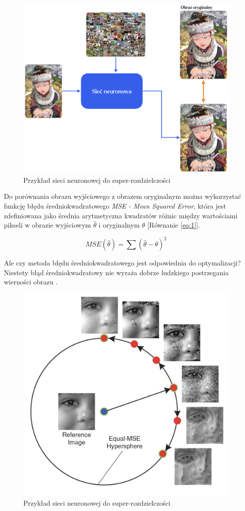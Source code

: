 \begin{figure}[h]
    \centering
    \includegraphics[width=0.55\linewidth]{Rozdziały/02.Podstawy_teoretyczne/Obrazy/SR_CNN.png}
    \caption{Przykład sieci neuronowej do super-rozdzielczości}
    \label{fig:image18}
\end{figure}



Do porównania obrazu wyjściowego z obrazem oryginalnym można wykorzystać funkcję błędu średniokwadratowego \textit{MSE - Mean Squared Error}, która jest zdefiniowana jako średnia arytmetyczna kwadratów różnic między wartościami pikseli w obrazie wyjściowym $\hat{\theta }$ i oryginalnym $\theta$ [Równanie \ref{eq:1}].

\begin{equation}
    MSE(\hat{\theta }) = \sum(\hat{\theta } - \theta )^2 \label{eq:1}
\end{equation}

Ale czy metoda błędu średniokwadratowego jest odpowiednia do optymalizacji?
Niestety błąd średniokwadratowy nie wyraża dobrze ludzkiego postrzegania wierności obrazu \cite{4775883}.

\begin{figure}[h]
    \centering
    \includegraphics[width=0.55\linewidth]{Rozdziały/02.Podstawy_teoretyczne/Obrazy/MSE.png}
    \caption{Przykład sieci neuronowej do super-rozdzielczości}
    \label{fig:image56}
\end{figure}

